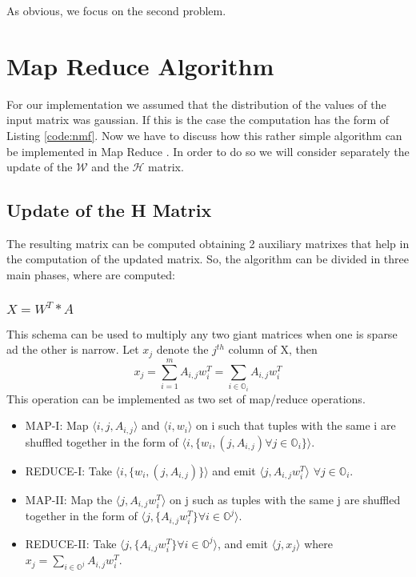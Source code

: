 \documentclass[a4paper,12pt]{article}
\begin{document}
As obvious, we focus on the second problem.

\section{Map Reduce Algorithm }
\label{mapreduce}

For our implementation we assumed that the distribution of the values of the input matrix was gaussian\cite{liu2010}.
If this is the case the computation has the form of Listing \ref{code:nmf}.
Now we have to discuss how this rather simple algorithm can be implemented in Map Reduce \cite{liu2010}.
In order to do so we will consider separately the update of the $\mathcal{W}$ and the $\mathcal{H}$ matrix.

 \subsection{Update of the H Matrix}
    The resulting matrix can be computed obtaining 2 auxiliary
    matrixes that help in the computation of the updated matrix. So,
    the algorithm can be divided in three main phases, where are
    computed:
  \subsubsection{$ X = W^T * A $}
        This schema can be used to multiply any two giant matrices when one
        is sparse ad the other is narrow. Let $x_j$ denote the $j^{th}$ column of X, then 
        $$ x_j = \sum_{i=1}^{m} A_{i,j} w_{i}^{T} = \sum_{i \in \mathbb{O}_i} A_{i,j} w_{i}^{T} $$ 
        This operation can be implemented as two set of map/reduce
        operations.
        \begin{itemize}
          \item MAP-I: Map $ \langle i, j, A_{i,j} \rangle $ and $\langle i, w_i \rangle$ on i
            such that tuples with the same i are shuffled together in
            the form of  $ \langle i, \{w_{i}, (j, A_{i,j}) \forall j
            \in \mathbb{O}_i \} \rangle$.

         \item REDUCE-I: Take  $ \langle i, \{w_{i}, (j, A_{i,j}) \}
           \rangle$ and emit  $ \langle j, A_{i,j}  w_{i}^{T}
           \rangle$ $\forall j \in \mathbb{O}_i $.

          \item MAP-II: Map the $ \langle j, A_{i,j}  w_{i}^{T}
           \rangle$ on j such as tuples with the same j are shuffled
           together in the form of $ \langle j, \{A_{i,j}  w_{i}^{T} \}
           \forall i \in \mathbb{O}^j \rangle$.

          \item REDUCE-II: Take $ \langle j, \{A_{i,j}  w_{i}^{T} \}
           \forall i \in \mathbb{O}^j \rangle$, and emit $\langle j,
           x_j \rangle$ where $ x_j = \sum_{i \in \mathbb{O}^j} A_{i,j}  w_{i}^{T} $.

         \end{itemize}
\end{document}

